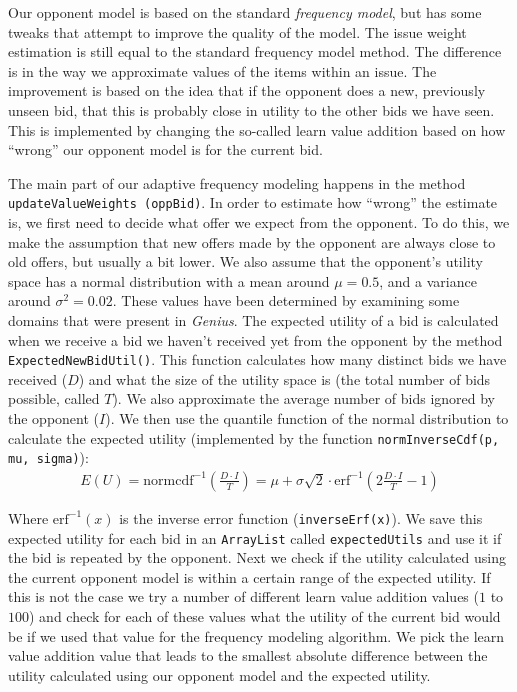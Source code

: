 Our opponent model is based on the standard \emph{frequency model}, but has some tweaks that attempt to improve the quality of the model. The issue weight estimation is still equal to the standard frequency model method. The difference is in the way we approximate values of the items within an issue. The improvement is based on the idea that if the opponent does a new, previously unseen bid, that this is probably close in utility to the other bids we have seen. This is implemented by changing the so-called learn value addition based on how ``wrong'' our opponent model is for the current bid. 

The main part of our adaptive frequency modeling happens in the method \texttt{updateValueWeights (oppBid)}.
In order to estimate how ``wrong'' the estimate is, we first need to decide what offer we expect from the opponent.
To do this, we make the assumption that new offers made by the opponent are always close to old offers, but usually a bit lower. 
We also assume that the opponent's utility space has a normal distribution with a mean around $\mu = 0.5$, and a variance around $\sigma^2 = 0.02$. 
These values have been determined by examining some domains that were present in \textit{Genius}. 
The expected utility of a bid is calculated when we receive a bid we haven't received yet from the opponent by the method \verb-ExpectedNewBidUtil()-. This function calculates how many distinct bids we have received ($D$) and what the size of the utility space is (the total number of bids possible, called $T$). We also approximate the average number of bids ignored by the opponent ($I$). We then use the quantile function of the normal distribution to calculate the expected utility (implemented by the function \verb-normInverseCdf(p, mu, sigma)-):
\begin{align}
  E(U) = \text{normcdf}^{-1} \left(\frac{D \cdot I}{T}\right) = \mu + \sigma \sqrt{2} \cdot \text{erf}^{-1} \left(2 \frac{D \cdot I}{T} - 1\right)
\end{align}

Where $\text{erf}^{-1}(x)$ is the inverse error function (\verb-inverseErf(x)-). 
We save this expected utility for each bid in an \verb-ArrayList- called \verb-expectedUtils- and use it if the bid is repeated by the opponent. 
Next we check if the utility calculated using the current opponent model is within a certain range of the expected utility. 
If this is not the case we try a number of different learn value addition values ($1$ to $100$) and check for each of these values what the utility of the current bid would be if we used that value for the frequency modeling algorithm. 
We pick the learn value addition value that leads to the smallest absolute difference between the utility calculated using our opponent model and the expected utility. 

